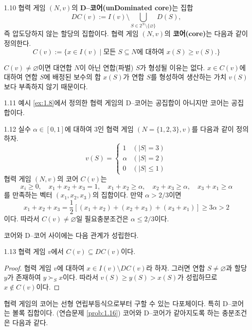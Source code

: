 \documentclass{article}
\numberwithin{equation}{section}
\begin{document}
\begin{dfn}{}{1.10}
	협력 게임 $(N,v)$의 \textbf{D--코어(unDominated core)}는 집합
	\[
		DC(v):=I(v)\setminus\bigcup_{S\in 2^N\setminus\{\varnothing\}}D(S),
	\]
	즉 압도당하지 않는 할당의 집합이다. 협력 게임 $(N,v)$의 \textbf{코어(core)}는 다음과 같이 정의한다.
	\[
		C(v):=\{x\in I(v)\mid\text{모든 }S\subseteq N\text{에 대하여 }x(S)\geq v(S).\}
	\]
\end{dfn}

\noindent $C(v)\ne\varnothing$이면 대연합 $N$이 아닌 연합(파벌) $S$가 형성될 이유는 없다. $x\in C(v)$에 대하여 연합 $S$에 배정된 보수의 합 $x(S)$가 연합 $S$를 형성하여 생산하는 가치 $v(S)$보다 부족하지 않기 때문이다.

\begin{example}{}{1.11}
	예시 \ref{ex:1.8}에서 정의한 협력 게임의 D--코어는 공집합이 아니지만 코어는 공집합이다.
\end{example}

\begin{example}{}{1.12}
	실수 $\alpha\in[0,1]$에 대하여 $3$인 협력 게임 $(N=\{1,2,3\},v)$를 다음과 같이 정의하자.
	\[
		v(S)=\begin{cases}
			1 & (\vert S\vert=3)\\
			\alpha & (\vert S\vert=2)\\
			0 & (\vert S\vert\leq1)
		\end{cases}
	\]
	협력 게임 $(N,v)$의 코어 $C(v)$는
	\[
		x_i\geq0,\quad x_1+x_2+x_3=1,\quad x_1+x_2\geq\alpha,\quad x_2+x_3\geq\alpha,\quad x_3+x_1\geq\alpha
	\]
	를 만족하는 벡터 $(x_1,x_2,x_3)$의 집합이다. 만약 $\alpha>2/3$이면
	\[
		x_1+x_2+x_3=\frac{1}{2}[(x_1+x_2)+(x_2+x_3)+(x_3+x_1)]\geq3\alpha>2
	\]
	이다. 따라서 $C(v)\ne\varnothing$일 필요충분조건은 $\alpha\leq2/3$이다.
\end{example}

\newpage
코어와 D--코어 사이에는 다음 관계가 성립한다.

\begin{thm}{}{1.13}
	협력 게임 $v$에서 $C(v)\subseteq DC(v)$이다.
\end{thm}

\begin{proof}
	협력 게임 $v$에 대하여 $x\in I(v)\setminus DC(v)$라 하자. 그러면 연합 $S\ne\varnothing$과 할당 $y$가 존재하여 $y\succ_Sx$이다. 따라서 $v(S)\geq y(S)>x(S)$가 성립하므로 $x\notin C(v)$이다.
\end{proof}

협력 게임의 코어는 선형 연립부등식으로부터 구할 수 있는 다포체이다. 특히 D--코어는 볼록 집합이다. (연습문제 \ref{prob:1.16}) 코어와 D--코어가 같아지도록 하는 충분조건은 다음과 같다.
\end{document}

